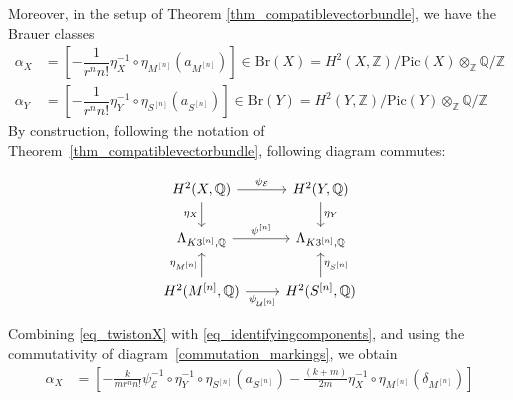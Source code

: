 \documentclass[12pt,a4paper]{amsart}
\theoremstyle{plain}
\theoremstyle{definition}
\theoremstyle{remark}
\def\Pic{\mathrm{Pic}}
\def\Z{\mathbb{Z}}
\def\QQ{\mathbb{Q}}
\newcommand{\Br}{\mathrm{Br}}
\newcommand{\psin}{{\psi^{[n]}}}
\newcommand{\rathodge}[1]{\psi_{#1}}
\begin{document}
Moreover, in the setup of Theorem \ref{thm_compatiblevectorbundle}, we have the Brauer classes
\begin{align}
    \alpha_X&=\left[-\dfrac{1}{r^nn!}\eta_X^{-1}\circ\eta_{M^{[n]}}(a_{M^{[n]}})\right]\in\Br(X)=H^2(X,\mathbb{Z})/\Pic(X)\otimes_{\Z}\QQ/\Z \label{eq_twistonX}\\
    \alpha_Y&=\left[-\dfrac{1}{r^nn!}\eta_Y^{-1}\circ\eta_{S^{[n]}}(a_{S^{[n]}})\right]\in\Br(Y)=H^2(Y,\mathbb{Z})/\Pic(Y)\otimes_{\Z}\QQ/\Z \label{eq_twistonY}
\end{align}
By construction, following the notation of Theorem~\ref{thm_compatiblevectorbundle}, following diagram commutes:

\begin{equation}\label{commutation_markings}
    \begin{tikzcd}
	{H^2(X,\QQ)} & {H^2(Y,\QQ)} \\
	{\Lambda_{K3^{[n]},\QQ}} & {\Lambda_{K3^{[n]},\QQ}} \\
	{H^2(M^{[n]},\QQ)} & {H^2(S^{[n]},\QQ)}
	\arrow["{\rathodge{\mathcal{E}}}", from=1-1, to=1-2]
	\arrow["{\eta_X}"', from=1-1, to=2-1]
	\arrow["{\eta_Y}", from=1-2, to=2-2]
	\arrow["\psin", from=2-1, to=2-2]
	\arrow["{\eta_{M^{[n]}}}", from=3-1, to=2-1]
	\arrow["{\rathodge{\mathcal{U}^{[n]}}}"', from=3-1, to=3-2]
	\arrow["{\eta_{S^{[n]}}}"', from=3-2, to=2-2]
\end{tikzcd}
\end{equation}

Combining \eqref{eq_twistonX} with \eqref{eq_identifyingcomponents}, and using the commutativity of diagram~\eqref{commutation_markings}, we obtain
\begin{align}
    \alpha_X&=\left[-\frac{k}{m r^nn!}\rathodge{\mathcal{E}}^{-1}\circ\eta_{Y}^{-1}\circ \eta_{S^{[n]}}(a_{S^{[n]}})-\frac{(k+m)}{2m}\eta_X^{-1}\circ\eta_{M^{[n]}}(\delta_{M^{[n]}})\right]\label{eq_twistX}
\end{align}
\end{document}
